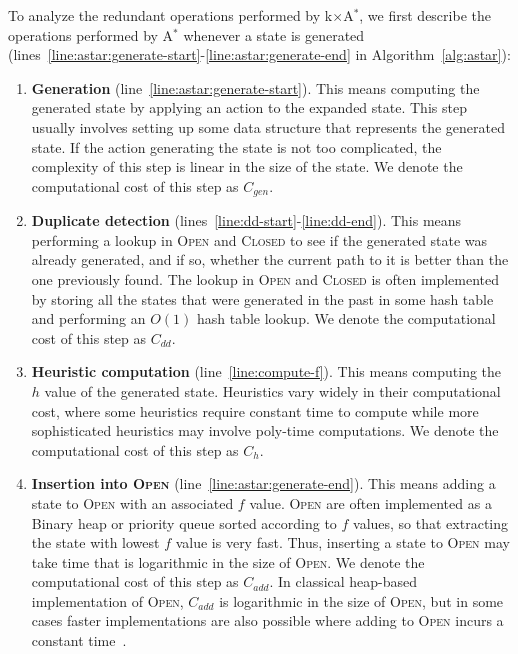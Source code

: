 \documentclass{aicom2e}
\newcommand{\astar}{A$^*$}
\newcommand{\kxastar}{k$\times$A$^*$}
\newcommand{\open}{\textsc{Open}}
\newcommand{\closed}{\textsc{Closed}}
\begin{document}
To analyze the redundant operations performed by \kxastar{}, we first describe the operations performed by \astar{} whenever a state is generated (lines~\ref{line:astar:generate-start}-\ref{line:astar:generate-end} in Algorithm~\ref{alg:astar}):
\begin{enumerate}
\item {\bf Generation}  (line~\ref{line:astar:generate-start}). This means computing the generated state by applying 
an action to the expanded state. This step usually involves setting up some data structure that represents the generated state. If the action generating the state is not too complicated, the complexity of this step is linear in the size of the state. We
denote the computational cost of this step as $C_{gen}$.
\item {\bf Duplicate detection}  (lines~\ref{line:dd-start}-\ref{line:dd-end}). This means performing a lookup in \open{} and \closed{} to see if the generated state was already generated, and if so, whether the current path to it is better than the one previously found. The lookup in \open{} and \closed{} is often implemented by storing all the states that were generated in the past in some hash table and performing an $O(1)$ hash table lookup. We denote the computational cost of this step as $C_{dd}$. 
\item {\bf Heuristic computation}  (line~\ref{line:compute-f}). This means computing the $h$ value of the generated state. Heuristics vary widely in their computational cost, where some heuristics require constant time to compute while more sophisticated heuristics may involve poly-time computations. We denote the computational cost of this step as $C_{h}$. 
\item {\bf Insertion into \open{}}  (line~\ref{line:astar:generate-end}). This means adding a state to \open{} with an associated $f$ value. \open{} are often implemented as a Binary heap or priority queue sorted according to $f$ values, so that extracting the state with lowest $f$ value is very fast. Thus, inserting a state to \open{} may take time that is logarithmic in the size of \open{}. We denote the computational cost of this step as $C_{add}$. In classical heap-based implementation of \open{}, $C_{add}$ is logarithmic in the size of \open{}, but in some cases faster implementations are also possible where adding to \open{} incurs a constant time~\cite{GILON2016,BurnsHLR12}.
\end{enumerate}

\end{document}
